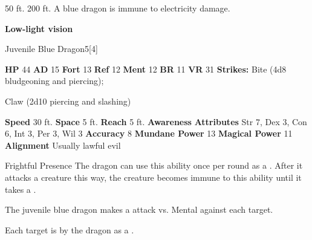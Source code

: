       
       50 ft.
     200 ft.
     A blue dragon is immune to electricity damage.
    \par\noindent\textbf{Low-light vision}
  

  \begin{monsubsection}{Juvenile Blue Dragon}{5}[4]
    \vspace{-1em}\vspace{-1em}
    \vspace{0em}

    
    

    \begin{spellcontent}
      \begin{spelltargetinginfo}
        \pari \textbf{HP} 44 \monsep
          \textbf{AD} 15 \monsep
          \textbf{Fort} 13 \monsep
          \textbf{Ref} 12 \monsep
          \textbf{Ment} 12
        \pari \textbf{BR} 11 \monsep
        \textbf{VR} 31
        \pari \textbf{Strikes:}
            Bite  (4d8 bludgeoning and piercing);
\par Claw  (2d10 piercing and slashing)
      \end{spelltargetinginfo}
    \end{spellcontent}
    \begin{monsterfooter}
      \pari \textbf{Speed} 30 ft. \monsep
        \textbf{Space} 5 ft. \monsep
        \textbf{Reach} 5 ft.
      \pari \textbf{Awareness} 
      \pari \textbf{Attributes}
        Str 7, Dex 3,
        Con 6, Int 3,
        Per 3, Wil 3
      \pari \textbf{Accuracy} 8 \monsep
        \textbf{Mundane Power} 13 \monsep
      \textbf{Magical Power} 11
      \pari \textbf{Alignment} Usually lawful evil
    \end{monsterfooter}
  \end{monsubsection}
  \begin{freeability}{Frightful Presence}
      The dragon can use this ability once per round as a .
      After it attacks a creature this way, the creature becomes immune to this ability until it takes a .
      \par The juvenile blue dragon makes a  attack
        vs. Mental against each target.
    
    \hit Each target is  by the dragon as a .
    \end{freeability}
  

